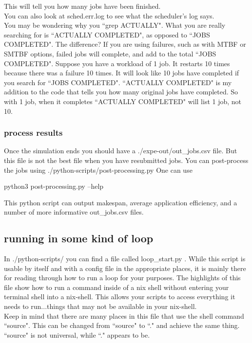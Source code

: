 \documentclass[titlepage]{article}
\begin{document}
This will tell you how many jobs have been finished.\\

You can also look at sched.err.log to see what the scheduler's log says.\\


You may be wondering why you ``grep ACTUALLY".  What you are really searching for is ``ACTUALLY COMPLETED",
as opposed to ``JOBS COMPLETED".  The difference?  If you are using failures, such as with MTBF or SMTBF options, failed jobs will complete,
and add to the total ``JOBS COMPLETED".
Suppose you have a workload of 1 job.  It restarts 10 times because there was a failure 10 times.  It will look like 10 jobs have
completed if you search for ``JOBS COMPLETED".  ``ACTUALLY COMPLETED" is my addition to the code that tells you how many original jobs
have completed.  So with 1 job, when it completes ``ACTUALLY COMPLETED" will list 1 job, not 10.

\subsubsection{process results}
Once the simulation ends you should have a ./expe-out/out\_jobs.csv file.  But this file is not the best file when you have resubmitted jobs.
You can post-process the jobs using ./python-scripts/post-processing.py
One can use
\begin{terminal}
python3 post-processing.py --help
\end{terminal}

This python script can output makespan, average application efficiency, and a number of more informative out\_jobs.csv files.
\hypertarget{howto_running_in_loop}{}

\subsection{running in some kind of loop}
In ./python-scripts/ you can find a file called loop\_start.py .
While this script is usable by itself and with a config file in the appropriate places, it is mainly there for reading through how to run a loop for your
purposes.  The highlights of this file show how to run a command inside of a nix shell without entering your terminal shell into a nix-shell. This allows your scripts to access
everything it needs to run...things that may not be available in your nix-shell. \\ 

Keep in mind that there are many places in this file that use the shell command ``source".
This can be changed from ``source" to ``." and achieve the same thing.  ``source" is not universal, while ``." appears to be.
\end{document}
